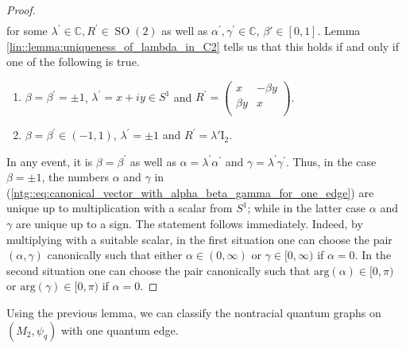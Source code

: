 \documentclass{amsart}
\newcommand{\comments}[1]{}
\newtheorem{thm}{Theorem}[section]
\newcommand{\C}{\mathbb{C}}
\DeclareMathOperator{\SO}{SO}
\DeclareMathOperator{\spann}{span}
\begin{document}
\begin{proof}
\begin{align}
    \end{align}
    for some $\lambda^\prime \in \C, R^\prime \in \SO(2)$ as well as $\alpha^\prime, \gamma^\prime \in \C$, $\beta'\in[0,1]$. 
    Lemma \ref{lin::lemma:uniqueness_of_lambda_in_C2} tells us that this holds if and only if one of the following is true.
    \begin{enumerate}[label=(\alph*)]
        \item $\beta = \beta^\prime = \pm 1$, $\lambda^\prime = x + iy \in S^1$ and $\displaystyle R^\prime = \begin{pmatrix}
            x & -\beta y \\
            \beta y & x \\
        \end{pmatrix}$.
        \item $\beta = \beta^\prime \in (-1,1)$, $\lambda^\prime = \pm1$ and $\displaystyle R^\prime = \lambda'\mathrm{I}_2$.
    \end{enumerate}
    In any event, it is $\beta = \beta^\prime$ as well as $\alpha = \lambda^\prime \alpha^\prime$ and $\gamma = \lambda^\prime \gamma^\prime$. Thus, in the case $\beta = \pm 1$, the numbers $\alpha$ and $\gamma$ in (\ref{ntg::eq:canonical_vector_with_alpha_beta_gamma_for_one_edge}) are unique up to multiplication with a scalar from $S^1$; while in the latter case $\alpha$ and $\gamma$ are unique up to a sign. The statement follows immediately. Indeed, by multiplying with a suitable scalar, in the first situation one can choose the pair $(\alpha, \gamma)$ canonically such that either $\alpha \in (0, \infty)$ or $\gamma \in [0, \infty)$ if $\alpha = 0$. In the second situation one can choose the pair canonically such that $\mathrm{arg}(\alpha) \in [0, \pi)$ or $\mathrm{arg}(\gamma) \in [0, \pi)$ if $\alpha = 0$.
\end{proof}

Using the previous lemma, we can classify the nontracial quantum graphs on $(M_2, \psi_q)$ with one quantum edge.

\comments{
\begin{thm}
    \label{ntg::thm:classification_nontracial_qgraphs_with_one_edge}
         Let $\mathcal{G}_{\alpha, \beta, \gamma}^{(q, 1C)}$ be the quantum graph with $q$-adjusted Pauli space 
    \begin{align*}
        V_{\alpha, \beta, \gamma}^{(q, 1C)} = \spann\left\{ \begin{pmatrix}
            \alpha \\ 1 \\ i \beta \\ \gamma
        \end{pmatrix} \right\}.
    \end{align*}
    Every quantum graph $\mathcal{G}$ on $(M_2, \psi_q)$ with exactly one quantum edge is either the trivial quantum graph $\mathcal{G}^{(q,1A)}$ or isomorphic to exactly one of the quantum graphs $\mathcal{G}^{(q,1B)}_\alpha$, $\mathcal{G}_{\alpha, \beta, \gamma}^{(q,1C)}$, where $\alpha \in \C$, and $(\alpha, \beta, \gamma) \in J^{(q,1C)}$, respectively.
\end{thm}
}
\end{document}
